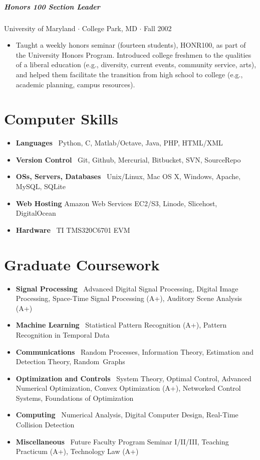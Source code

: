\documentclass[10pt,letterpaper]{article}
\begin{document}
\subparagraph{Honors 100 Section Leader}
University of Maryland $\cdot$ College Park, MD $\cdot$ Fall 2002
\begin{itemize}
    \item Taught a weekly honors seminar (fourteen students), HONR100, as part of the University Honors Program. Introduced college freshmen to the qualities of a liberal education (e.g., diversity, current events, community service, arts), and helped them facilitate the transition from high school to college (e.g., academic planning, campus resources).
\end{itemize}


\section*{Computer Skills}

\begin{itemize}
    \item \textbf{Languages} \ Python, C, Matlab/Octave, Java, PHP, HTML/XML
    \item \textbf{Version Control} \ Git, Github, Mercurial, Bitbucket, SVN, SourceRepo
    \item \textbf{OSs, Servers, Databases} \ Unix/Linux, Mac OS X, Windows, Apache, MySQL, SQLite 
    \item \textbf{Web Hosting} Amazon Web Services EC2/S3, Linode, Slicehost, DigitalOcean
    \item \textbf{Hardware} \ TI TMS320C6701 EVM
\end{itemize}


\section*{Graduate Coursework}

\begin{itemize} 
    \item \textbf{Signal Processing} \ Advanced Digital Signal Processing, Digital Image Processing, Space-Time Signal Processing (A+), Auditory Scene Analysis (A+) 
    \item \textbf{Machine Learning} \ Statistical Pattern Recognition (A+), Pattern Recognition in Temporal Data 
    \item \textbf{Communications} \ Random Processes, Information Theory, Estimation and Detection Theory, Random~Graphs 
    \item \textbf{Optimization and Controls} \ System Theory, Optimal Control, Advanced Numerical Optimization, Convex Optimization (A+), Networked Control Systems, Foundations of Optimization 
    \item \textbf{Computing} \ Numerical Analysis, Digital Computer Design, Real-Time Collision Detection 
    \item \textbf{Miscellaneous} \ Future Faculty Program Seminar I/II/III, Teaching Practicum (A+), Technology Law (A+) 
\end{itemize}
\end{document}
